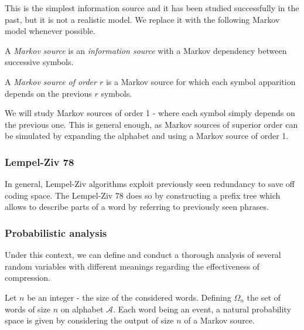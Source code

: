 \begin{rmk}
    \label{rmk:memoryless}
    This is the simplest information source and it has been 
    studied successfully in the past, but it is not a realistic 
    model. We replace it with the following Markov model whenever 
    possible.
\end{rmk}

\begin{df}
    \label{def:markov}
    A \emph{Markov source} is an \emph{information source}
    with a Markov dependency between successive symbols.
\end{df}

\begin{df}
    \label{def:markovorder}
    A \emph{Markov source of order $r$} is a Markov source
    for which each symbol apparition depends on the previous 
    $r$ symbols.
\end{df}

\begin{rmk}
    \label{rmk:markov2}
    We will study Markov sources of order 1 - where each
    symbol simply depends on the previous one. This is 
    general enough, as Markov sources of superior order
    can be simulated by expanding the alphabet and 
    using a Markov source of order 1.
\end{rmk}


\subsubsection{ Lempel-Ziv 78 }

In general, Lempel-Ziv algorithms exploit previously seen 
redundancy to save off coding space. The Lempel-Ziv 78 does
so by constructing a prefix tree which allows to describe 
parts of a word by referring to previously seen phrases.




\subsubsection{ Probabilistic analysis }

Under this context, we can define and conduct a thorough
analysis of several random variables with different meanings
regarding the effectiveness of compression.

\begin{nota}
    \label{nota:universe}
    Let $n$ be an integer - the size of the considered words.
    Defining $\Omega_n$ the set of words of size $n$ on alphabet
    $\mathcal{A}$. Each word being an event, a natural probability
    space is given by considering the output of size $n$ of a Markov
    source.
\end{nota}

